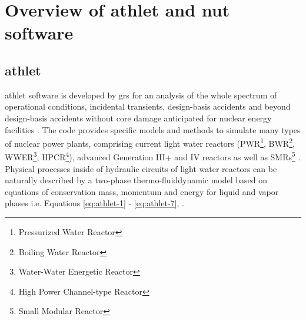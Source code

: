 \chapter{Overview of \acrshort{athlet} and \acrshort{nut} software}\label{chapter:athlet-nut}

\section{\acrshort{athlet}}
\label{sec:athlet-overview}




\acrfull{athlet} software is developed by \acrshort{grs} for an analysis of the whole spectrum of operational conditions, incidental transients, design-basis accidents and beyond design-basis accidents without core damage anticipated for nuclear energy facilities \cite{grs:athlet-info}. The code provides specific models and methods to simulate many types of nuclear power plants, comprising current light water reactors (PWR\footnote{Pressurized Water Reactor}, BWR\footnote{Boiling Water Reactor}, WWER\footnote{Water-Water Energetic Reactor}, HPCR\footnote{High Power Channel-type Reactor}), advanced Generation III+ and IV reactors as well as SMRs\footnote{Small Modular Reactor} \cite{grs:athlet-info}.\\



Physical processes inside of hydraulic circuits of light water reactors can be naturally described by a two-phase thermo-fluiddynamic model based on equations of conservation mass, momentum and energy for liquid and vapor phases i.e. Equations \ref{eq:athlet-1} - \ref{eq:athlet-7}, \cite{lt:ATHLMaM}.\\


